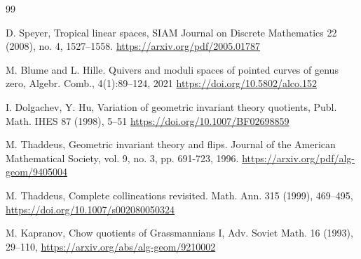 \documentclass[12pt, reqno]{amsart}
\theoremstyle{definition}
\theoremstyle{remark}
\numberwithin{equation}{section}
\begin{document}

\begin{thebibliography}{99}

 D. Speyer, Tropical linear spaces, SIAM Journal on Discrete Mathematics 22 (2008), no. 4, 1527–1558. \url{https://arxiv.org/pdf/2005.01787}



 M. Blume and L. Hille. Quivers and moduli spaces of pointed curves of genus zero, Algebr. Comb., 4(1):89–124,
 2021
\url{https://doi.org/10.5802/alco.152}




 I. Dolgachev, Y. Hu, Variation of geometric invariant theory quotients, Publ. Math.
IHES 87 (1998), 5–51
\url{https://doi.org/10.1007/BF02698859}





 M. Thaddeus, Geometric invariant theory and flips. Journal of the American Mathematical Society, vol. 9, no. 3, pp. 691-723, 1996. 
\url{https://arxiv.org/pdf/alg-geom/9405004}



 M. Thaddeus, Complete collineations revisited. Math. Ann. 315 (1999), 469–495,
\url{https://doi.org/10.1007/s002080050324}




 M. Kapranov, Chow quotients of Grassmannians I, Adv. Soviet Math. 16 (1993),
29–110,
\url{https://arxiv.org/abs/alg-geom/9210002}










\end{thebibliography}
\end{document}
